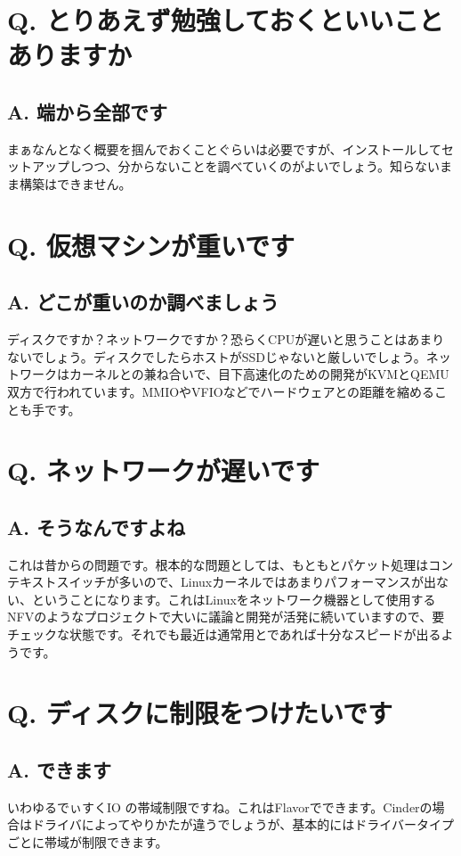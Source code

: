 \documentclass[9pt,b5paper,tombo,openany]{jsbook}
\begin{document}
\section*{Q. とりあえず勉強しておくといいことありますか}
\subsection*{A. 端から全部です}
まぁなんとなく概要を掴んでおくことぐらいは必要ですが、インストールしてセットアップしつつ、分からないことを調べていくのがよいでしょう。知らないまま構築はできません。

\section*{Q. 仮想マシンが重いです}
\subsection*{A. どこが重いのか調べましょう}
ディスクですか？ネットワークですか？恐らくCPUが遅いと思うことはあまりないでしょう。ディスクでしたらホストがSSDじゃないと厳しいでしょう。ネットワークはカーネルとの兼ね合いで、目下高速化のための開発がKVMとQEMU双方で行われています。MMIOやVFIOなどでハードウェアとの距離を縮めることも手です。

\section*{Q. ネットワークが遅いです}
\subsection*{A. そうなんですよね}
これは昔からの問題です。根本的な問題としては、もともとパケット処理はコンテキストスイッチが多いので、Linuxカーネルではあまりパフォーマンスが出ない、ということになります。これはLinuxをネットワーク機器として使用するNFVのようなプロジェクトで大いに議論と開発が活発に続いていますので、要チェックな状態です。それでも最近は通常用とであれば十分なスピードが出るようです。

\section*{Q. ディスクに制限をつけたいです}
\subsection*{A. できます}
いわゆるでぃすくIO の帯域制限ですね。これはFlavorでできます。Cinderの場合はドライバによってやりかたが違うでしょうが、基本的にはドライバータイプごとに帯域が制限できます。
\end{document}
